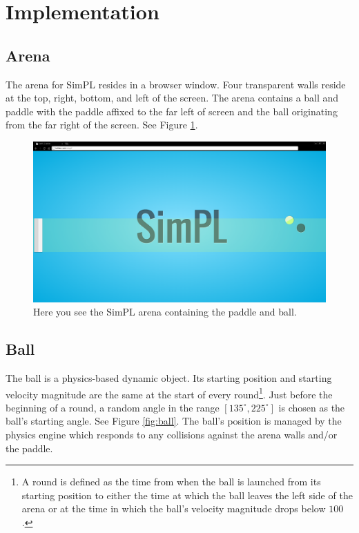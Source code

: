 \documentclass[a4paper,10pt]{article}
\begin{document}
\section{Implementation}

\subsection{Arena}

The arena for SimPL resides in a browser window. Four transparent walls reside at the top, right, bottom, and left of the screen. The arena contains a ball and paddle with the paddle affixed to the far left of screen and the ball originating from the far right of the screen. See Figure \ref{fig:arena}.

\begin{figure}[H]  
  \centering
  \includegraphics[width=.9\textwidth]{figures/arena.png}
  \caption{Here you see the SimPL arena containing the paddle and ball.}
  \label{fig:arena}
\end{figure}

\subsection{Ball}

The ball is a physics-based dynamic object. Its starting position and starting velocity magnitude are the same at the start of every round\footnote{A round is defined as the time from when the ball is launched from its starting position to either the time at which the ball leaves the left side of the arena or at the time in which the ball's velocity magnitude drops below $100$.}. Just before the beginning of a round, a random angle in the range $[135^\circ,225^\circ]$ is chosen as the ball's starting angle. See Figure \ref{fig:ball}. The ball's position is managed by the physics engine which responds to any collisions against the arena walls and/or the paddle.
\end{document}
